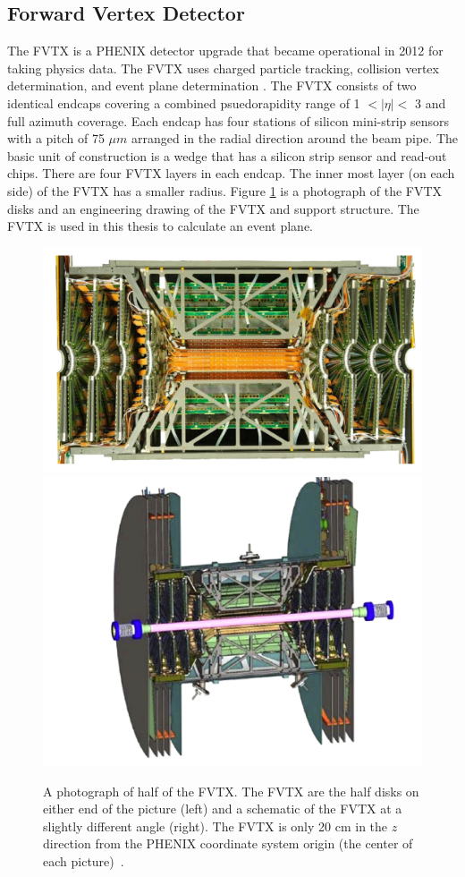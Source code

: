\subsection{Forward Vertex Detector}
The FVTX is a PHENIX detector upgrade that became operational in 2012 for taking physics data. The FVTX uses charged particle tracking, collision vertex determination, and event plane determination \cite{Aidala201444}. The FVTX consists of two identical endcaps covering a combined psuedorapidity range of 1 $<|\eta|<$ 3 and full azimuth coverage. Each endcap has four stations of silicon mini-strip sensors with a pitch of 75 $\mu m$ arranged in the radial direction around the beam pipe. The basic unit of construction is a wedge that has a silicon strip sensor and read-out chips. There are four FVTX layers in each endcap. The inner most layer (on each side) of the FVTX has a smaller radius. Figure \ref{fig:fvtx_cutaway} is a photograph of the FVTX disks and an engineering drawing of the FVTX and support structure. The FVTX is used in this thesis to calculate an event plane.
\begin{figure}[h!]
\begin{center}
\includegraphics[width=0.45\linewidth]{figs/fvtx_cutaway.png}
\includegraphics[width=0.45\linewidth]{figs/fvtx_diagram.png}
\caption{A photograph of half of the FVTX. The FVTX are the half disks on either end of the picture (left) and a schematic of the FVTX at a slightly different angle (right). The FVTX is only 20 cm in the $z$ direction from the PHENIX coordinate system origin (the center of each picture)~\cite{Aidala201444}.}
\label{fig:fvtx_cutaway}
\end{center}
\end{figure}
